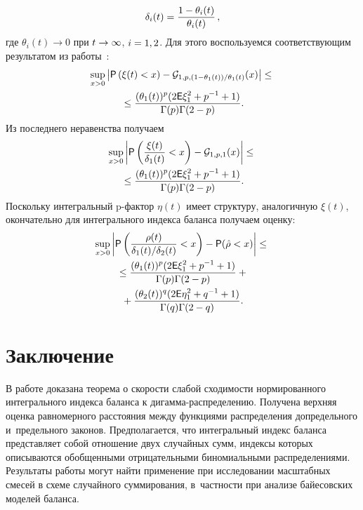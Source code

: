 \begin{multicols}{2}
\noindent
$$
\delta_i(t)=\displaystyle\frac{\displaystyle 1-\theta_i(t)\mathstrut}{\displaystyle \theta_i(t)\mathstrut}\,,
$$
 где 
$\theta_i(t)\to 0$ при $t\hm\to\infty$, $i\hm=1,2$. Для этого  
воспользуемся соответствующим результатом из работы~\cite{ShTs2021}:
\begin{multline*}
\sup\limits_{x>0}\left|{\sf P}\left( \xi(t)< x\right)-{\cal G}_{1,p,(1-
\theta_1(t))/\theta_1(t)}(x)\right|\le{}\\
{}\le
\displaystyle\frac{\displaystyle (\theta_1(t))^p(2{\sf E}\xi_1^2+p^{-1}+1)\mathstrut}{\displaystyle \Gamma(p)\Gamma(2-p)\mathstrut}.
\end{multline*}
Из последнего неравенства получаем
\begin{multline*}
\sup\limits_{x>0}\left| {\sf P}\left( \displaystyle\frac{\displaystyle \xi(t)\mathstrut}{\displaystyle \delta_1(t)\mathstrut}< x\right)-{\cal  G}_{1,p,1}(x)\right|\le{}\\
{}\le
\displaystyle\frac{\displaystyle (\theta_1(t))^p(2{\sf E}\xi_1^2+p^{-1}+1)\mathstrut}{\displaystyle \Gamma(p)\Gamma(2-p)\mathstrut}.
\end{multline*}
Поскольку интегральный p-фактор $\eta(t)$ имеет структуру, аналогичную $\xi(t)$, 
окончательно для интегрального индекса баланса получаем оценку:
\begin{multline*}
\sup\limits_{x>0}\left|{\sf P}\left(\displaystyle\frac{\displaystyle \rho(t)\mathstrut}{\displaystyle \delta_1(t)/\delta_2(t)\mathstrut}<x\right)-
{\sf P}({\hat \rho}<x)\right|\le{}
\\
{}\le \displaystyle\frac{\displaystyle (\theta_1(t))^p(2{\sf E}\xi_1^2+p^{-1}+1)\mathstrut}{\displaystyle \Gamma(p)\Gamma(2-p)\mathstrut}+{}\\
{}+
\displaystyle\frac{\displaystyle (\theta_2(t))^q(2{\sf E}\eta_1^2+q^{-1}+1)\mathstrut}{\displaystyle \Gamma(q)\Gamma(2-q)\mathstrut}.
\end{multline*}

\vspace*{-14pt}

\section{Заключение}

\vspace*{-3pt}


В работе доказана теорема о скорости слабой сходимости нормированного 
интегрального индекса баланса к ди\-гам\-ма-распре\-де\-ле\-нию. Получена верхняя 
оценка равномерного расстояния между функциями распределения допредельного 
и~предельного законов. Предполагается, что интегральный индекс баланса 
представляет собой отношение двух случайных сумм, индексы которых описываются 
обобщенными отрицательными биномиальными распределениями. Результаты работы 
могут найти применение при исследовании масштабных смесей в схеме случайного 
суммирования, в~частности при анализе байесовских моделей баланса.


\end{multicols}
